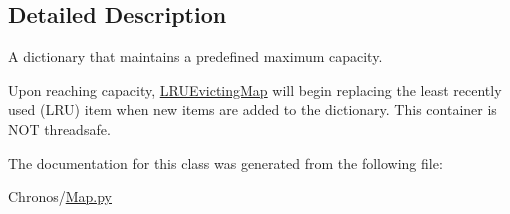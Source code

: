 \subsection{Detailed Description}
A dictionary that maintains a predefined maximum capacity. 

Upon reaching capacity, \hyperlink{classChronos_1_1Map_1_1LRUEvictingMap}{L\+R\+U\+Evicting\+Map} will begin replacing the least recently used (L\+RU) item when new items are added to the dictionary. This container is N\+OT threadsafe. 

The documentation for this class was generated from the following file\+:\begin{DoxyCompactItemize}
\item 
Chronos/\hyperlink{Map_8py}{Map.\+py}\end{DoxyCompactItemize}
